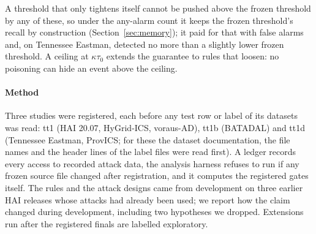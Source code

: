 \documentclass[sigconf,review,anonymous]{acmart}
\begin{document}
A threshold that only tightens itself cannot be pushed above the frozen threshold by any of these, so
under the any-alarm count it keeps the frozen threshold's recall by construction
(Section~\ref{sec:memory}); it paid for that with false alarms and, on Tennessee Eastman, detected no
more than a slightly lower frozen threshold. A ceiling at $\kappa\tau_0$ extends the guarantee to rules
that loosen: no poisoning can hide an event above the ceiling.

\paragraph{Method}
Three studies were registered, each before any test row or label of its datasets was read: tt1 (HAI
20.07, HyGrid-ICS, voraus-AD), tt1b (BATADAL) and tt1d (Tennessee Eastman, ProvICS; for these the
dataset documentation, the file names and the header lines of the label files were read first). A ledger records every access to recorded attack data, the analysis harness refuses to
run if any frozen source file changed after registration, and it computes the registered gates
itself. The rules and the attack designs came from development on three earlier HAI releases whose
attacks had already been used; we report how the claim changed during development, including two
hypotheses we dropped. Extensions run after the registered finals are labelled exploratory.
\end{document}
